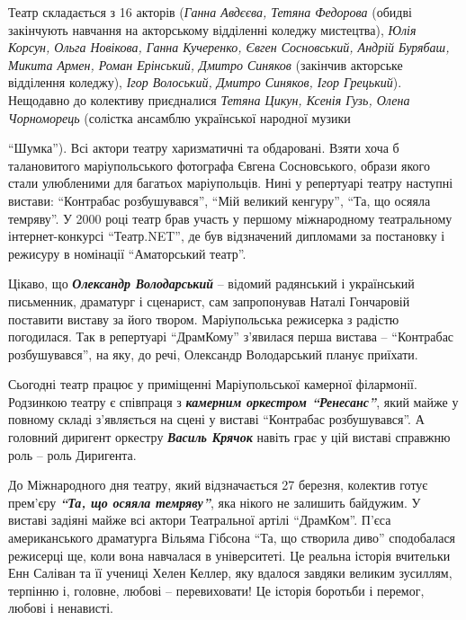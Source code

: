 Театр складається з 16 акторів (\emph{Ганна Авдєєва, Тетяна Федорова} (обидві
закінчують навчання на акторському відділенні коледжу мистецтва), \emph{Юлія Корсун,
Ольга Новікова, Ганна Кучеренко, Євген Сосновський, Андрій Бурябаш, Микита
Армен, Роман Ерінський, Дмитро Синяков} (закінчив акторське відділення коледжу),
\emph{Ігор Волоський, Дмитро Синяков, Ігор Грецький}). Нещодавно до колективу
приєдналися \emph{Тетяна Цикун, Ксенія Гузь, Олена Чорноморець} (солістка ансамблю
української народної музики\par\noindent\enquote{Шумка}). Всі актори театру харизматичні та
обдаровані. Взяти хоча б талановитого маріупольського фотографа Євгена
Сосновського, образи якого стали улюбленими для багатьох маріупольців. Нині у
репертуарі театру наступні вистави:  \enquote{Контрабас розбушувався}, \enquote{Мій великий
кенгуру}, \enquote{Та, що осяяла темряву}. У 2000 році театр брав участь у першому
міжнародному театральному інтернет-конкурсі \enquote{Театр.NET}, де був відзначений
дипломами за постановку і режисуру в номінації \enquote{Аматорський театр}.


Цікаво, що \emph{\textbf{Олександр Володарський}} – відомий радянський і український
письменник, драматург і сценарист, сам запропонував Наталі Гончаровій поставити
виставу за його твором. Маріупольська режисерка з радістю погодилася. Так в
репертуарі  \enquote{ДрамКому} з'явилася перша вистава – \enquote{Контрабас розбушувався}, на
яку, до речі, Олександр Володарський планує приїхати.

Сьогодні театр працює у приміщенні Маріупольської камерної філармонії.
Родзинкою театру є співпраця з \emph{\textbf{камерним оркестром \enquote{Ренесанс}}}, який майже у
повному складі з'являється на сцені у виставі \enquote{Контрабас розбушувався}. А
головний диригент оркестру \emph{\textbf{Василь Крячок}} навіть грає у цій виставі справжню
роль – роль Диригента.

До Міжнародного дня театру, який відзначається 27 березня, колектив готує
прем'єру \textbf{\emph{\enquote{Та, що осяяла темряву}}}, яка нікого не залишить байдужим. У виставі
задіяні майже всі актори Театральної артілі \enquote{ДрамКом}. П'єса американського
драматурга Вільяма Гібсона \enquote{Та, що створила диво} сподобалася режисерці ще,
коли вона навчалася в університеті. Це реальна історія вчительки Енн Саліван та
її учениці Хелен Келлер, яку вдалося завдяки великим зусиллям, терпінню і,
головне, любові –  перевиховати! Це історія боротьби і перемог, любові і
ненависті.

